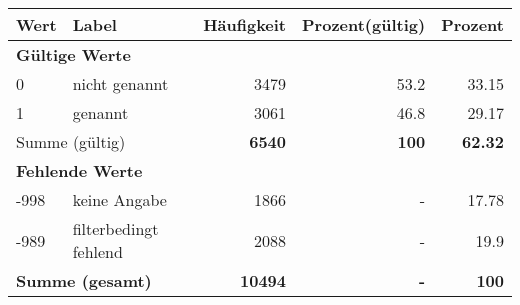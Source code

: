      \begin{longtable}{lXrrr}
     \toprule
     \textbf{Wert} & \textbf{Label} & \textbf{Häufigkeit} & \textbf{Prozent(gültig)} & \textbf{Prozent} \\
     \endhead
     \midrule
     \multicolumn{5}{l}{\textbf{Gültige Werte}}\\

     0 &
     \multicolumn{1}{X}{ nicht genannt   } &


       \num{3479} &
       \num[round-mode=places,round-precision=2]{53,2} &
         \num[round-mode=places,round-precision=2]{33,15} \\

     1 &
     \multicolumn{1}{X}{ genannt   } &


       \num{3061} &
       \num[round-mode=places,round-precision=2]{46,8} &
         \num[round-mode=places,round-precision=2]{29,17} \\
     \midrule
     \multicolumn{2}{l}{Summe (gültig)} &
       \textbf{\num{6540}} &
     \textbf{100} &
       \textbf{\num[round-mode=places,round-precision=2]{62,32}} \\
     \multicolumn{5}{l}{\textbf{Fehlende Werte}}\\
       -998 &
       keine Angabe &
         \num{1866} &
        - &
         \num[round-mode=places,round-precision=2]{17,78} \\
       -989 &
       filterbedingt fehlend &
         \num{2088} &
        - &
         \num[round-mode=places,round-precision=2]{19,9} \\
     \midrule
     \multicolumn{2}{l}{\textbf{Summe (gesamt)}} &
          \textbf{\num{10494}} &
        \textbf{-} &
        \textbf{100} \\
     \bottomrule
     \end{longtable}
     
